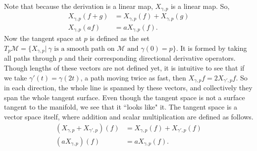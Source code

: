 \documentclass{article}
\theoremstyle{definition}
\theoremstyle{named}
\begin{document}
\noindent Note that because the derivation is a linear map, $X_{\gamma, p}$ is a linear map. So,
\begin{align*}
    X_{\gamma, p}(f + g) &= X_{\gamma, p}(f) + X_{\gamma, p}(g) \\
    X_{\gamma, p}(af) &= aX_{\gamma, p}(f).
\end{align*}
Now the tangent space at $p$  is defined as the set $T_p\mathcal{M} = \{X_{\gamma,p} | \  \gamma \text{ is a smooth path on \(\mathcal{M}\) and } \gamma (0) = p\}$. It is formed by taking all paths through $p$ and their corresponding directional derivative operators. Though lengths of these vectors are not defined yet, it is intuitive to see that if we take $\gamma'(t) = \gamma(2t)$, a path moving twice as fast, then $X_{\gamma, p}f = 2X_{\gamma', p}f$. So in each direction, the whole line is spanned by these vectors, and collectively they span the whole tangent surface. Even though the tangent space is not a surface tangent to the manifold, we see that it ``looks like" it. The tangent space is a vector space itself, where addition and scalar multiplication are defined as follows.
\begin{align*}
    (X_{\gamma, p} + X_{\gamma', p})(f) &= X_{\gamma, p}(f) + X_{\gamma', p}(f) \\
    (aX_{\gamma, p})(f) &= aX_{\gamma, p}(f).
\end{align*}
\end{document}
